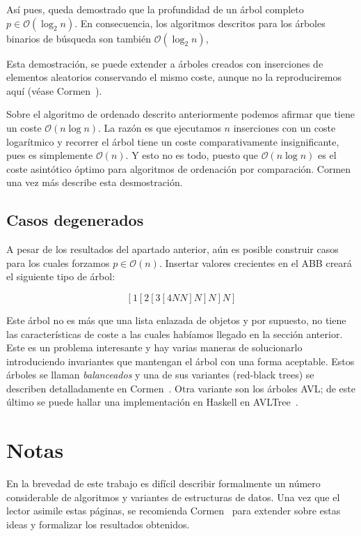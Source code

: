 \documentclass[10pt,spanish,twocolumn]{article}
\begin{document}
Así pues, queda demostrado que la profundidad de un árbol completo $p \in 
\mathcal{O}(\log_2 n)$.  En consecuencia, los algoritmos descritos para los 
árboles binarios de búsqueda son también $\mathcal{O}(\log_2 n)$,

Esta demostración, se puede extender a árboles creados con inserciones de 
elementos aleatorios conservando el mismo coste, aunque no la reproduciremos 
aquí (véase Cormen~\cite[Ch12.4]{Cormen:01}).

Sobre el algoritmo de ordenado descrito anteriormente podemos afirmar que tiene 
un coste $\mathcal{O}(n \log n)$.  La razón es que ejecutamos $n$ inserciones 
con un coste logarítmico y recorrer el árbol tiene un coste comparativamente 
insignificante, pues es simplemente $\mathcal{O}(n)$.  Y esto no es todo, 
puesto que $\mathcal{O}(n \log n)$ es el coste asintótico óptimo para 
algoritmos de ordenación por comparación.  Cormen~\cite[Ch8.1]{Cormen:01} una 
vez más describe esta desmostración.

\subsection{Casos degenerados}
A pesar de los resultados del apartado anterior, aún es posible construir casos 
para los cuales forzamos $p \in \mathcal{O}(n)$.  Insertar valores crecientes 
en el ABB creará el siguiente tipo de árbol:

$$
    [1 [2 [3 [4 N N] N] N] N]
$$

Este árbol no es más que una lista enlazada de objetos y por supuesto, no tiene 
las características de coste a las cuales habíamos llegado en la sección 
anterior.  Este es un problema interesante y hay varias maneras de solucionarlo 
introduciendo invariantes que mantengan el árbol con una forma aceptable.  
Estos árboles se llaman \emph{balanceados} y una de sus variantes (red-black 
trees) se describen detalladamente en Cormen~\cite[Ch14]{Cormen:01}.  Otra 
variante son los árboles AVL; de este último se puede hallar una implementación 
en Haskell en AVLTree~\cite{Lledo:09:ALVtreeHS}.

\section{Notas}

En la brevedad de este trabajo es difícil describir formalmente un número 
considerable de algoritmos y variantes de estructuras de datos.  Una vez que el 
lector asimile estas páginas, se recomienda Cormen~\cite{Cormen:01} para 
extender sobre estas ideas y formalizar los resultados obtenidos.
\end{document}
